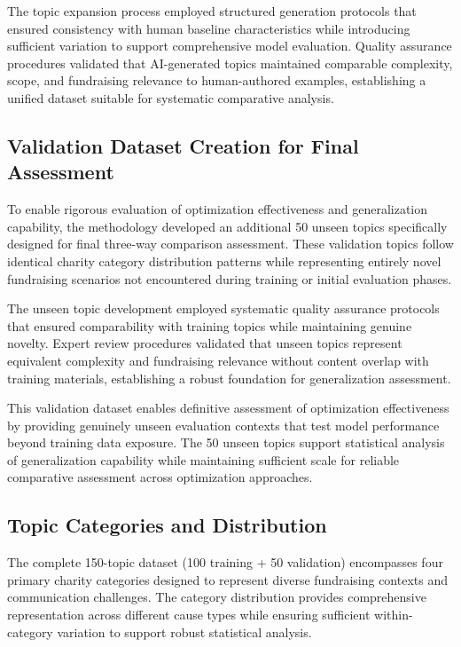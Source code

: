 The topic expansion process employed structured generation protocols that ensured consistency with human baseline characteristics while introducing sufficient variation to support comprehensive model evaluation. Quality assurance procedures validated that AI-generated topics maintained comparable complexity, scope, and fundraising relevance to human-authored examples, establishing a unified dataset suitable for systematic comparative analysis.

\subsection{Validation Dataset Creation for Final Assessment}

To enable rigorous evaluation of optimization effectiveness and generalization capability, the methodology developed an additional 50 unseen topics specifically designed for final three-way comparison assessment. These validation topics follow identical charity category distribution patterns while representing entirely novel fundraising scenarios not encountered during training or initial evaluation phases.

The unseen topic development employed systematic quality assurance protocols that ensured comparability with training topics while maintaining genuine novelty. Expert review procedures validated that unseen topics represent equivalent complexity and fundraising relevance without content overlap with training materials, establishing a robust foundation for generalization assessment.

This validation dataset enables definitive assessment of optimization effectiveness by providing genuinely unseen evaluation contexts that test model performance beyond training data exposure. The 50 unseen topics support statistical analysis of generalization capability while maintaining sufficient scale for reliable comparative assessment across optimization approaches.

\subsection{Topic Categories and Distribution}

The complete 150-topic dataset (100 training + 50 validation) encompasses four primary charity categories designed to represent diverse fundraising contexts and communication challenges. The category distribution provides comprehensive representation across different cause types while ensuring sufficient within-category variation to support robust statistical analysis.


